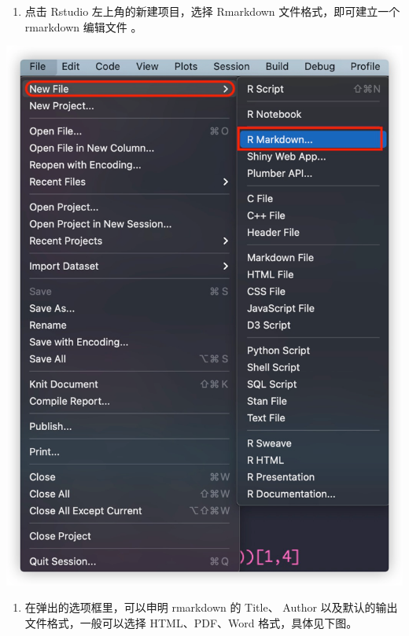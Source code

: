 \documentclass[
]{book}
\providecommand{\tightlist}{%
  \setlength{\itemsep}{0pt}\setlength{\parskip}{0pt}}
\begin{document}
\begin{enumerate}
\def\labelenumi{\arabic{enumi}.}
\tightlist
\item
  点击 Rstudio 左上角的新建项目，选择 Rmarkdown 文件格式，即可建立一个
  rmarkdown 编辑文件 。
\end{enumerate}

\includegraphics{images/paste-533FDD15.png}

\begin{enumerate}
\def\labelenumi{\arabic{enumi}.}
\setcounter{enumi}{1}
\tightlist
\item
  在弹出的选项框里，可以申明 rmarkdown 的 Title、 Author
  以及默认的输出文件格式，一般可以选择 HTML、PDF、Word
  格式，具体见下图。
\end{enumerate}
\end{document}
